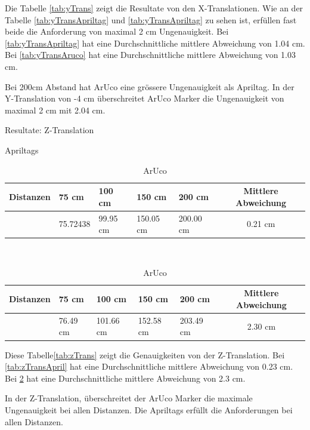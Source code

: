 Die Tabelle \ref{tab:yTrans} zeigt die Resultate von den X-Translationen. 
Wie an der Tabelle \ref{tab:yTransApriltag} und \ref{tab:yTransApriltag} zu sehen ist, erfüllen fast beide die Anforderung von maximal 2 cm Ungenauigkeit.
Bei \ref{tab:yTransApriltag} hat eine Durchschnittliche mittlere Abweichung von 1.04 cm. 
Bei \ref{tab:yTransAruco} hat eine Durchschnittliche mittlere Abweichung von 1.03 cm.

Bei 200cm Abstand hat ArUco eine grössere Ungenauigkeit als Apriltag. 
In der Y-Translation von -4 cm überschreitet ArUco Marker die Ungenauigkeit von maximal 2 cm mit 2.04 cm. 

\begin{table}[!htb]
    \caption{Resultate: Z-Translation}
    \label{tab:zTrans}
    \begin{subtable}{\linewidth}
        \centering
        \caption{Apriltags}
        \label{tab:zTransApril}
        \begin{tabular}{|l|l|l|l|l|c|}
            \hline
            Distanzen & 75 cm & 100 cm & 150 cm & 200 cm &  Mittlere Abweichung\\
            \hline
            &75.72438 & 99.95 cm & 150.05 cm & 200.00 cm & 0.21 cm\\
            \hline
        \end{tabular}
    \end{subtable}
    \\[\smallskipamount]
    \begin{subtable}{\linewidth}
        \centering
        \caption{ArUco}
        \label{tab:zTransAruco}
        \begin{tabular}{|l|l|l|l|l|c|}
            \hline
            Distanzen & 75 cm & 100 cm & 150 cm & 200 cm  &  Mittlere Abweichung \\
            \hline
            & 76.49 cm & 101.66 cm & 152.58 cm & 203.49 cm & 2.30 cm\\
            \hline
        \end{tabular}
    \end{subtable} 
\end{table}

Diese Tabelle\ref{tab:zTrans} zeigt die Genauigkeiten von der Z-Translation.
Bei \ref{tab:zTransApril} hat eine Durchschnittliche mittlere Abweichung von 0.23 cm. 
Bei \ref{tab:zTransAruco} hat eine Durchschnittliche mittlere Abweichung von 2.3 cm.

In der Z-Translation, überschreitet der ArUco Marker die maximale Ungenauigkeit bei allen Distanzen.
Die Apriltags erfüllt die Anforderungen bei allen Distanzen.


